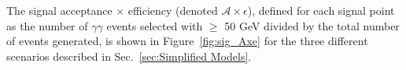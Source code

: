 \documentclass[dissertation.tex]{subfiles}
\begin{document}
The signal acceptance $\times$ efficiency (denoted $\mathcal{A}\times\epsilon$), defined for each signal point as the number of $\gamma\gamma$ events selected with \MET $\geq$ 50 GeV divided by the total number of events generated, is shown in Figure~\ref{fig:sig_Axe} for the three different scenarios described in Sec.~\ref{sec:Simplified Models}.

\begin{figure}
	\centering
	\hspace{1cm}

\end{figure}
\end{document}
